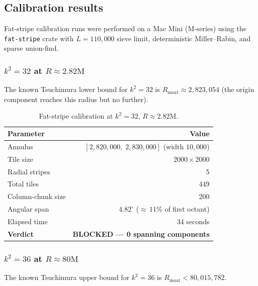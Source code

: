 \documentclass[11pt,a4paper]{article}
\theoremstyle{definition}
\theoremstyle{plain}
\theoremstyle{remark}
\begin{document}
\subsection{Calibration results}\label{sec:fs-calibration}

Fat-stripe calibration runs were performed on a Mac Mini (M-series) using the \texttt{fat-stripe} crate with $L = 110{,}000$ sieve limit, deterministic Miller--Rabin, and sparse union-find.

\subsubsection{\texorpdfstring{$k^2 = 32$}{k\texttwosuperior\ = 32} at \texorpdfstring{$R \approx 2.82\text{M}$}{R approx 2.82M}}

The known Tsuchimura lower bound for $k^2 = 32$ is $R_{\text{moat}} \approx 2{,}823{,}054$ (the origin component reaches this radius but no further).

\begin{table}[ht]
\centering
\begin{tabular}{@{}lr@{}}
\toprule
Parameter & Value \\
\midrule
Annulus                & $[2{,}820{,}000,\; 2{,}830{,}000]$ (width $10{,}000$) \\
Tile size              & $2000 \times 2000$ \\
Radial stripes         & 5 \\
Total tiles            & 449 \\
Column-chunk size      & 200 \\
Angular span           & $4.82^\circ$ (${\approx}\,11\%$ of first octant) \\
Elapsed time           & 34 seconds \\
\midrule
\textbf{Verdict}       & \textbf{BLOCKED --- 0 spanning components} \\
\bottomrule
\end{tabular}
\caption{Fat-stripe calibration at $k^2 = 32$, $R \approx 2.82\text{M}$.}
\label{tab:fs-k32}
\end{table}

\subsubsection{\texorpdfstring{$k^2 = 36$}{k\texttwosuperior\ = 36} at \texorpdfstring{$R \approx 80\text{M}$}{R approx 80M}}

The known Tsuchimura upper bound for $k^2 = 36$ is $R_{\text{moat}} < 80{,}015{,}782$.
\end{document}
